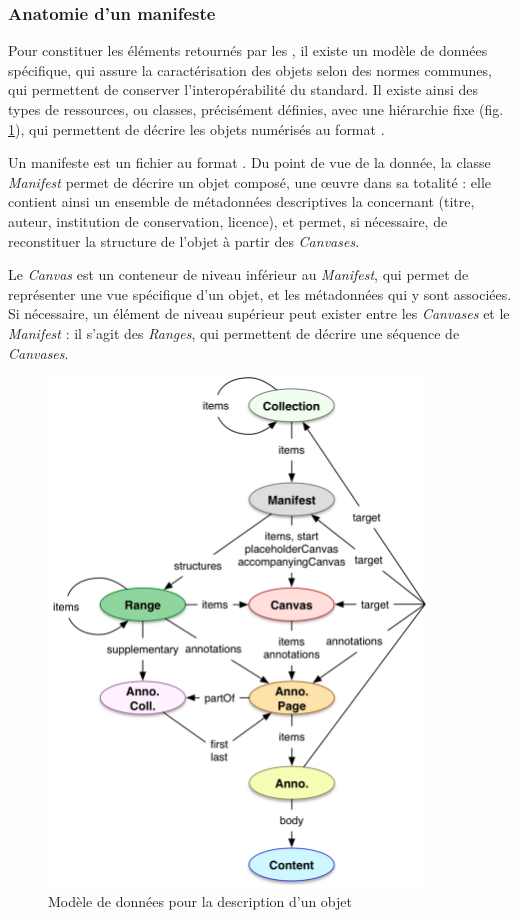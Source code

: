     \subsubsection{Anatomie d'un manifeste}
Pour constituer les éléments retournés par les \api \iiif, il existe un modèle de données spécifique, qui assure la caractérisation des objets selon des normes communes, qui permettent de conserver l'interopérabilité du standard. Il existe ainsi des types de ressources, ou classes, précisément définies, avec une hiérarchie fixe (fig. \ref{fig:iiif_data_model}), qui permettent de décrire les objets numérisés au format \json.

Un manifeste est un fichier au format \json. Du point de vue de la donnée, la classe \textit{Manifest} permet de décrire un objet composé, une œuvre dans sa totalité : elle contient ainsi un ensemble de métadonnées descriptives la concernant (titre, auteur, institution de conservation, licence), et permet, si nécessaire, de reconstituer la structure de l'objet à partir des \textit{Canvases}.

Le \textit{Canvas} est un conteneur de niveau inférieur au \textit{Manifest}, qui permet de représenter une vue spécifique d'un objet, et les métadonnées qui y sont associées. Si nécessaire, un élément de niveau supérieur peut exister entre les \textit{Canvases} et le \textit{Manifest} : il s'agit des \textit{Ranges}, qui permettent de décrire une séquence de \textit{Canvases}.

\begin{figure}[H]
	\centering
	\includegraphics[width=10cm]{images/modele_donnees_iiif.png}
	\caption{Modèle de données \iiif pour la description d'un objet}
	\label{fig:iiif_data_model}
\end{figure}

